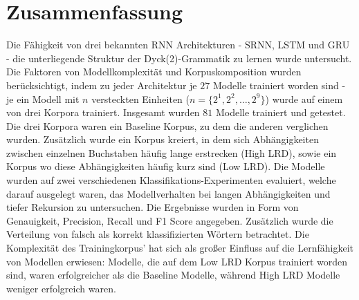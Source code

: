\section*{Zusammenfassung}
Die Fähigkeit von drei bekannten RNN Architekturen - SRNN, LSTM und GRU - die unterliegende Struktur der Dyck(2)-Grammatik zu lernen wurde untersucht. Die Faktoren von Modellkomplexität und Korpuskomposition wurden berücksichtigt, indem zu jeder Architektur je $27$ Modelle trainiert worden sind - je ein Modell mit $n$ versteckten Einheiten ($n = \lbrace 2^{1}, 2^{2}, \dots, 2^{9} \rbrace$) wurde auf einem von drei Korpora trainiert. Insgesamt wurden $81$ Modelle trainiert und getestet. Die drei Korpora waren ein Baseline Korpus, zu dem die anderen verglichen wurden. Zusätzlich wurde ein Korpus kreiert, in dem sich Abhängigkeiten zwischen einzelnen Buchstaben häufig lange erstrecken (High LRD), sowie ein Korpus wo diese Abhängigkeiten häufig kurz sind (Low LRD). Die Modelle wurden auf zwei verschiedenen Klassifikations-Experimenten evaluiert, welche darauf ausgelegt waren, das Modellverhalten bei langen Abhängigkeiten und tiefer Rekursion zu untersuchen. Die Ergebnisse wurden in Form von Genauigkeit, Precision, Recall und F1 Score angegeben. Zusätzlich wurde die Verteilung von falsch als korrekt klassifizierten Wörtern betrachtet. Die Komplexität des Trainingkorpus' hat sich als großer Einfluss auf die Lernfähigkeit von Modellen erwiesen: Modelle, die auf dem Low LRD Korpus trainiert worden sind, waren erfolgreicher als die Baseline Modelle, während High LRD Modelle weniger erfolgreich waren.